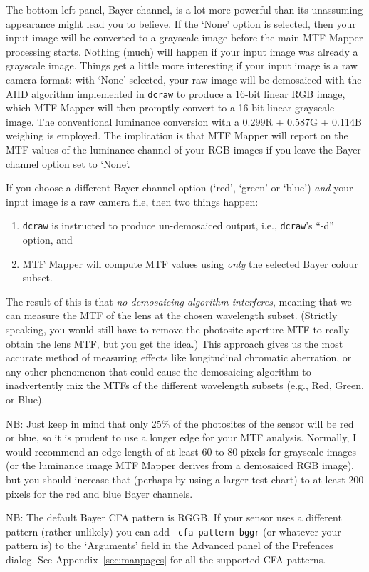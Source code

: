 \documentclass[a4paper]{article}
\begin{document}
The bottom-left panel, \textsf{Bayer channel}, is a lot more powerful than
its unassuming appearance might lead you to believe. If the `None' option is
selected, then your input image will be converted to a grayscale image
before the main MTF Mapper processing starts. Nothing (much) will happen if
your input image was already a grayscale image. Things get a little more
interesting if your input image is a raw camera format: with `None'
selected, your raw image will be demosaiced with the AHD algorithm
implemented in \texttt{dcraw} to produce a 16-bit linear RGB image, which
MTF Mapper will then promptly convert to a 16-bit linear grayscale image.
The conventional luminance conversion with a 0.299R + 0.587G + 0.114B weighing is
employed. The implication is that MTF Mapper will report on the MTF values
of the luminance channel of your RGB images if you leave the \textsf{Bayer
channel} option set to `None'.

If you choose a different \textsf{Bayer channel} option (`red', `green' or
`blue') \emph{and} your input image is a raw camera file, then two things
happen:
\begin{enumerate}
\item 
\texttt{dcraw} is instructed to produce un-demosaiced output, i.e., \texttt{dcraw}'s ``-d'' option, and
\item 
MTF Mapper will compute MTF values using \emph{only} the selected Bayer
colour subset. 
\end{enumerate}
The result of this is that \emph{no demosaicing algorithm interferes},
meaning that we can measure the MTF of the lens at the chosen wavelength
subset. (Strictly speaking, you would still have to remove the photosite aperture MTF
to really obtain the lens MTF, but you get the idea.)
This approach gives us the most accurate method of measuring effects like
longitudinal chromatic aberration, or any other phenomenon that could cause
the demosaicing algorithm to inadvertently mix the MTFs of the different
wavelength subsets (e.g., Red, Green, or Blue).


NB: Just keep in mind that only 25\% of the photosites of the sensor will be
red or blue, so it is prudent to use a longer edge for your MTF analysis.
Normally, I would recommend an edge length of at least 60 to 80 pixels for
grayscale images (or the luminance image MTF Mapper derives from a
demosaiced RGB image), but you should increase that (perhaps by using a larger
test chart) to at least 200 pixels for the red and blue Bayer channels.

NB: The default Bayer CFA pattern is RGGB.  If your sensor uses a different
pattern (rather unlikely) you can add \texttt{--cfa-pattern bggr} (or
whatever your pattern is) to the `Arguments' field in the \textsf{Advanced}
panel of the \textsf{Prefences} dialog. See Appendix~\ref{sec:manpages} for
all the supported CFA patterns.
\end{document}

